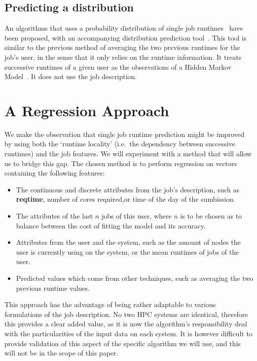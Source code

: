 \documentclass{article}
\begin{document}

\subsection{Predicting a distribution}
\label{sub:predicting_a_distribution}

An algorithms that uses a probability distribution of single job runtimes~\cite{probabilistic-backfilling} have been proposed, with an accompanying distribution prediction tool~\cite{hmm}. This tool is similar to the previous method of averaging the two previous runtimes for the job's user, in the sense that it only relies on the runtime information. It treats successive runtimes of a given user as the observations of a Hidden Markov Model~\cite{rabiner}. It does not use the job description.

\section{A Regression Approach}
\label{sec:our_approach}
We make the observation that single job runtime prediction might be improved by using both the `runtime locality' (i.e.\ the dependency between successive runtimes) and the job features. We will experiment with a method that will allow us to bridge this gap.
The chosen method is to perform regression on vectors containing the following features:
\begin{itemize}
  \item The continuous and discrete attributes from the job's description, such as \textbf{reqtime}, number of cores required,or time of the day of the sumbission.
  \item The attributes of the last $n$ jobs of this user, where $n$ is to be chosen as to balance between the cost of fitting the model and its accuracy.
  \item Attributes from the user and the system, such as the amount of nodes the user is currently using on the system, or the mean runtimes of jobs of the user.
  \item Predicted values which come from other techniques, such as averaging the two previous runtime values.
\end{itemize}
This approach has the advantage of being rather adaptable to various formulations of the job description.
No two HPC systems are identical, therefore this provides a clear added value, as it is now the algorithm's responsibility deal with the particularities of the input data on each system.
It is however difficult to provide validation of this aspect of the specific algorithm we will use, and this will not be in the scope of this paper.
\end{document}
